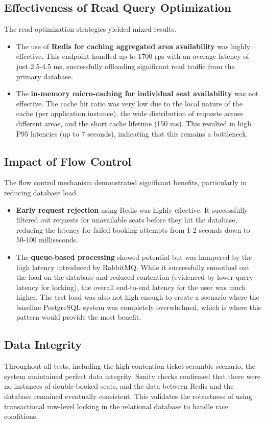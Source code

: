 \subsection{Effectiveness of Read Query Optimization}
The read optimization strategies yielded mixed results.
\begin{itemize}
    \item The use of \textbf{Redis for caching aggregated area availability} was highly effective. This endpoint handled up to 1700 rps with an average latency of just 2.5-4.5 ms, successfully offloading significant read traffic from the primary database.
    \item The \textbf{in-memory micro-caching for individual seat availability} was not effective. The cache hit ratio was very low due to the local nature of the cache (per application instance), the wide distribution of requests across different areas, and the short cache lifetime (150 ms). This resulted in high P95 latencies (up to 7 seconds), indicating that this remains a bottleneck.
\end{itemize}

\subsection{Impact of Flow Control}
The flow control mechanism demonstrated significant benefits, particularly in reducing database load.
\begin{itemize}
    \item \textbf{Early request rejection} using Redis was highly effective. It successfully filtered out requests for unavailable seats before they hit the database, reducing the latency for failed booking attempts from 1-2 seconds down to 50-100 milliseconds.
    \item The \textbf{queue-based processing} showed potential but was hampered by the high latency introduced by RabbitMQ. While it successfully smoothed out the load on the database and reduced contention (evidenced by lower query latency for locking), the overall end-to-end latency for the user was much higher. The test load was also not high enough to create a scenario where the baseline PostgreSQL system was completely overwhelmed, which is where this pattern would provide the most benefit.
\end{itemize}

\subsection{Data Integrity}
Throughout all tests, including the high-contention ticket scramble scenario, the system maintained perfect data integrity. Sanity checks confirmed that there were no instances of double-booked seats, and the data between Redis and the database remained eventually consistent. This validates the robustness of using transactional row-level locking in the relational database to handle race conditions.

